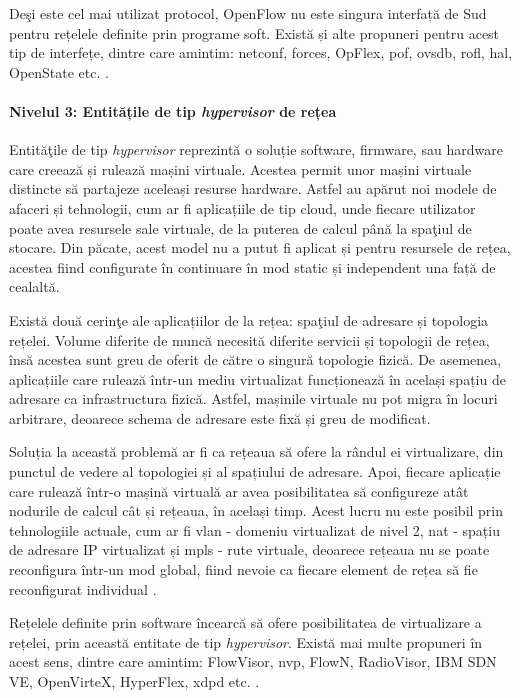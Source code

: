 Deşi este cel mai utilizat protocol, OpenFlow nu este singura interfață de Sud pentru rețelele definite prin programe soft. Există și alte propuneri pentru acest tip de interfețe, dintre care amintim: \gls{netconf}, \gls{forces}, OpFlex, \gls{pof}, \gls{ovsdb}, \gls{rofl}, \gls{hal}, OpenState etc. \cite{haleplidis2015network, zhou2014research, onfts016}.

\paragraph{Nivelul 3: Entitățile de tip \textit{hypervisor} de rețea}

Entităţile de tip \textit{hypervisor} reprezintă o soluție software, firmware, sau hardware care creează și rulează mașini virtuale. Acestea permit unor mașini virtuale distincte să partajeze aceleași resurse hardware. Astfel au apărut noi modele de afaceri și tehnologii, cum ar fi aplicațiile de tip cloud, unde fiecare utilizator poate avea resursele sale virtuale, de la puterea de calcul până la spaţiul de stocare. Din păcate, acest model nu a putut fi aplicat și pentru resursele de rețea, acestea fiind configurate în continuare în mod static și independent una față de cealaltă.

Există două cerinţe ale aplicațiilor de la rețea: spaţiul de adresare și topologia rețelei. Volume diferite de muncă necesită diferite servicii și topologii de rețea, însă acestea sunt greu de oferit de către o singură topologie fizică. De asemenea, aplicațiile care rulează într-un mediu virtualizat funcționează în același spațiu de adresare ca infrastructura fizică. Astfel, mașinile virtuale nu pot migra în locuri arbitrare, deoarece schema de adresare este fixă și greu de modificat.

Soluția la această problemă ar fi ca rețeaua să ofere la rândul ei virtualizare, din punctul de vedere al topologiei și al spațiului de adresare. Apoi, fiecare aplicație care rulează într-o mașină virtuală ar avea posibilitatea să configureze atât nodurile de calcul cât și rețeaua, în același timp. Acest lucru nu este posibil prin tehnologiile actuale, cum ar fi \gls{vlan} - domeniu virtualizat de nivel 2, \gls{nat} - spațiu de adresare IP virtualizat și \gls{mpls} - rute virtuale, deoarece rețeaua nu se poate reconfigura într-un mod global, fiind nevoie ca fiecare element de rețea să fie reconfigurat individual \cite{kreutz2015software, peng2012vdn, koponen2014network}.

Rețelele definite prin software încearcă să ofere posibilitatea de virtualizare a rețelei, prin această entitate de tip \textit{hypervisor}. Există mai multe propuneri în acest sens, dintre care amintim: FlowVisor, \gls{nvp}, FlowN, RadioVisor, IBM SDN VE, OpenVirteX, HyperFlex, \gls{xdpd} etc. \cite{sherwood2009flowvisor, gudipati2014radiovisor, al2014openvirtex, sune2013xdpd, blenk2015hyperflex}.

